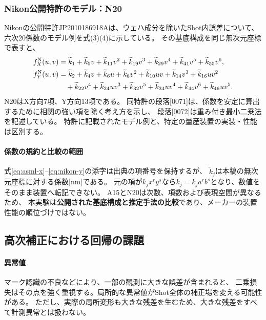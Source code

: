 \documentclass[11pt,a4paper]{ltjsarticle}
\begin{document}
\subsubsection{Nikon公開特許のモデル：N20}
Nikonの公開特許JP2010186918Aは、ウェハ成分を除いたShot内誤差について、
六次20係数のモデル例を式(3)(4)に示している\cite{nikon2010}。
その基底構成を同じ無次元座標で表すと、
\begin{align}
 f_X^{\mathrm N}(u,v)
 &=\widetilde k_1+\widetilde k_5v+\widetilde k_{11}v^2
   +\widetilde k_{19}v^3+\widetilde k_{29}v^4
   +\widetilde k_{41}v^5+\widetilde k_{55}v^6,\label{eq:nikon-x}\\
 f_Y^{\mathrm N}(u,v)
 &=\widetilde k_2+\widetilde k_4v+\widetilde k_6u
   +\widetilde k_8v^2+\widetilde k_{10}uv
   +\widetilde k_{14}v^3+\widetilde k_{16}uv^2 \notag\\
 &\quad+\widetilde k_{22}v^4+\widetilde k_{24}uv^3
   +\widetilde k_{32}v^5+\widetilde k_{34}uv^4
   +\widetilde k_{44}v^6+\widetilde k_{46}uv^5.\label{eq:nikon-y}
\end{align}
N20はX方向7項、Y方向13項である。
同特許の段落[0071]は、係数を安定に算出するために相関の強い項を除く考え方を示し、
段落[0072]は重み付き最小二乗法を記述している。
特許に記載されたモデル例と、特定の量産装置の実装・性能は区別する。

\paragraph{係数の規約と比較の範囲}
式\eqref{eq:asml-x}--\eqref{eq:nikon-y}の添字は出典の項番号を保持するが、
$\widetilde k_j$は本稿の無次元座標に対する係数[nm]である。
元の項が$k_jx^ry^s$なら$\widetilde k_j=k_ja^rb^s$となり、数値をそのまま装置へ転記できない。
A15とN20は次数、項数および表現空間が異なるため、
本実験は\textbf{公開された基底構成と推定手法の比較}であり、メーカーの装置性能の順位づけではない。

\subsection{高次補正における回帰の課題}
\paragraph{異常値}
マーク認識の不良などにより、一部の観測に大きな誤差が含まれると、
二乗損失はその点を強く重視する。局所的な異常値がShot全体の補正場を変える可能性がある。
ただし、実際の局所変形も大きな残差を生むため、大きな残差をすべて計測異常とは扱わない。
\end{document}
